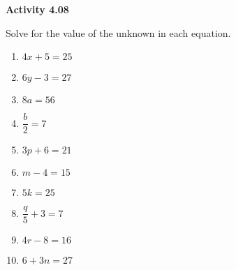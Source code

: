 \vspace{0.3ex}
\noindent\textbf{Activity 4.08}

\vspace{0.2ex}

Solve for the value of the unknown in each equation. 
\begin{multicols}{2}
\begin{enumerate}
    \item \(4x + 5 = 25\)  
    \item \(6y - 3 = 27\)  
    \item \(8a = 56\)  
    \item \(\dfrac{b}{2} = 7\)  
    \item \(3p + 6 = 21\)  
    \item \(m - 4 = 15\)  
    \item \(5k = 25\)  
    \item \(\dfrac{q}{5} + 3 = 7\)  
    \item \(4r - 8 = 16\)  
    \item \(6 + 3n = 27\)  
\end{enumerate}
\end{multicols}
